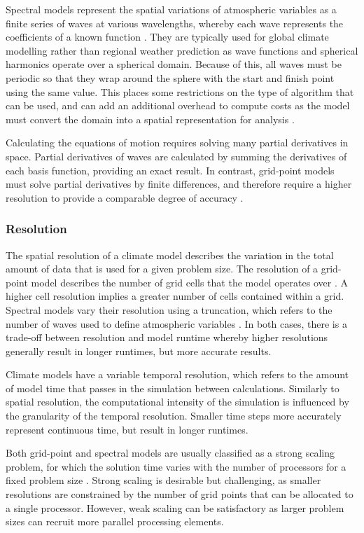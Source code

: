 \documentclass[a4paper,11pt]{report}
\begin{document}
\par
Spectral models represent the spatial variations of atmospheric variables as a finite series of waves at various wavelengths, whereby each wave represents the coefficients of a known function \cite{bourke1988spectral}. They are typically used for global climate modelling rather than regional weather prediction as wave functions and spherical harmonics operate over a spherical domain. Because of this, all waves must be periodic so that they wrap around the sphere with the start and finish point using the same value. This places some restrictions on the type of algorithm that can be used, and can add an additional overhead to compute costs as the model must convert the domain into a spatial representation for analysis \cite{orszag1974fourier}. 
\par
Calculating the equations of motion requires solving many partial derivatives in space. Partial derivatives of waves are calculated by summing the derivatives of each basis function, providing an exact result. In contrast, grid-point models must solve partial derivatives by finite differences, and therefore require a higher resolution to provide a comparable degree of accuracy \cite{bart1998coordinate}. 

\subsubsection{Resolution} 
The spatial resolution of a climate model describes the variation in the total amount of data that is used for a given problem size. The resolution of a grid-point model describes the number of grid cells that the model operates over \cite{goosse2010introduction}. A higher cell resolution implies a greater number of cells contained within a grid. Spectral models vary their resolution using a truncation, which refers to the number of waves used to define atmospheric variables \cite{goosse2010introduction}. In both cases, there is a trade-off between resolution and model runtime whereby higher resolutions generally result in longer runtimes, but more accurate results. 
\par
Climate models have a variable temporal resolution, which refers to the amount of model time that passes in the simulation between calculations. Similarly to spatial resolution, the computational intensity of the simulation is influenced by the granularity of the temporal resolution. Smaller time steps more accurately represent continuous time, but result in longer runtimes.
\par
Both grid-point and spectral models are usually classified as a strong scaling problem, for which the solution time varies with the number of processors for a fixed problem size \cite{colella2007performance}.  Strong scaling is desirable but challenging, as smaller resolutions are constrained by the number of grid points that can be allocated to a single processor. However, weak scaling can be satisfactory as larger problem sizes can recruit more parallel processing elements.
\end{document}
